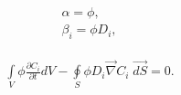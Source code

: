 \documentclass[a4paper,14pt,english]{extreport}
\begin{document}
  \begin{eqnarray}
 \begin{gathered}
 \label{eq:alpha}
 \alpha  =  \phi, \\ 
 \beta_{i}  = \phi D_{i},
 \end{gathered}
 \end{eqnarray}
 
   \begin{eqnarray}
 \label{eq:diffusuin_multicomp_integral}
 \int \limits_{V} \phi \frac{\partial C_{i}}{\partial t} d V - \oint \limits_{S} \phi D_{i} \vec{\nabla}C_{i} \; \vec{dS} = 0.
 \end{eqnarray}
 
 
 
 
 
 
\end{document}
